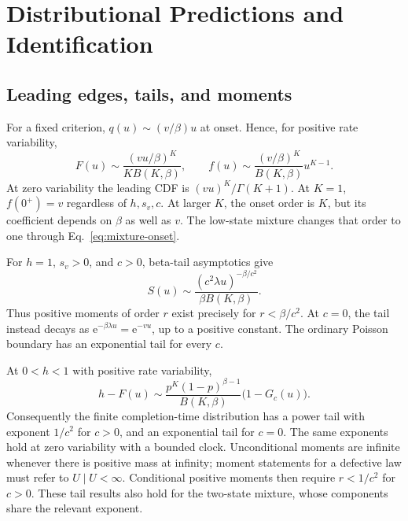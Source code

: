 \documentclass[12pt]{article}
\newcommand{\e}{\mathrm{e}}
\theoremstyle{definition}
\theoremstyle{plain}
\theoremstyle{remark}
\begin{document}
\section{Distributional Predictions and Identification}\label{sec:identification}

\subsection{Leading edges, tails, and moments}
For a fixed criterion, $q(u)\sim(v/\beta)u$ at onset. Hence, for positive rate variability,
\begin{equation}
 F(u)\sim\frac{(vu/\beta)^K}{K B(K,\beta)},\qquad
 f(u)\sim\frac{(v/\beta)^K}{B(K,\beta)}u^{K-1}.\label{eq:onset}
\end{equation}
At zero variability the leading CDF is $(vu)^K/\Gamma(K+1)$. At $K=1$, $f(0^+)=v$ regardless of $h,s_v,c$. At larger $K$, the onset order is $K$, but its coefficient depends on $\beta$ as well as $v$. The low-state mixture changes that order to one through Eq.~\eqref{eq:mixture-onset}.

For $h=1$, $s_v>0$, and $c>0$, beta-tail asymptotics give
\begin{equation}
 S(u)\sim\frac{(c^2\lambda u)^{-\beta/c^2}}{\beta B(K,\beta)}.\label{eq:proper-tail}
\end{equation}
Thus positive moments of order $r$ exist precisely for $r<\beta/c^2$. At $c=0$, the tail instead decays as $\e^{-\beta\lambda u}=\e^{-vu}$, up to a positive constant. The ordinary Poisson boundary has an exponential tail for every $c$.

At $0<h<1$ with positive rate variability,
\begin{equation}
 h-F(u)\sim
 \frac{p^K(1-p)^{\beta-1}}{B(K,\beta)}\big(1-G_c(u)\big).\label{eq:defective-tail}
\end{equation}
Consequently the finite completion-time distribution has a power tail with exponent $1/c^2$ for $c>0$, and an exponential tail for $c=0$. The same exponents hold at zero variability with a bounded clock. Unconditional moments are infinite whenever there is positive mass at infinity; moment statements for a defective law must refer to $U\mid U<\infty$. Conditional positive moments then require $r<1/c^2$ for $c>0$. These tail results also hold for the two-state mixture, whose components share the relevant exponent.
\end{document}

